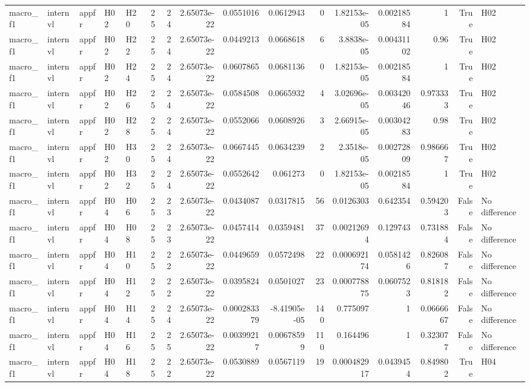 \begin{longtable}{lllllrrrrrrrrrrl}
macro\_f1 & internvl & appfr & H02 & H20 & 25 & 24 & 2.65073e-22 & 0.0551016 & 0.0612943 & 0 & 1.82153e-05 & 0.00218584 & 1 & True & H02 \\
macro\_f1 & internvl & appfr & H02 & H22 & 25 & 24 & 2.65073e-22 & 0.0449213 & 0.0668618 & 6 & 3.8838e-05 & 0.00431102 & 0.96 & True & H02 \\
macro\_f1 & internvl & appfr & H02 & H24 & 25 & 24 & 2.65073e-22 & 0.0607865 & 0.0681136 & 0 & 1.82153e-05 & 0.00218584 & 1 & True & H02 \\
macro\_f1 & internvl & appfr & H02 & H26 & 25 & 24 & 2.65073e-22 & 0.0584508 & 0.0665932 & 4 & 3.02696e-05 & 0.00342046 & 0.973333 & True & H02 \\
macro\_f1 & internvl & appfr & H02 & H28 & 25 & 24 & 2.65073e-22 & 0.0552066 & 0.0608926 & 3 & 2.66915e-05 & 0.00304283 & 0.98 & True & H02 \\
macro\_f1 & internvl & appfr & H02 & H30 & 25 & 24 & 2.65073e-22 & 0.0667445 & 0.0634239 & 2 & 2.3518e-05 & 0.00272809 & 0.986667 & True & H02 \\
macro\_f1 & internvl & appfr & H02 & H32 & 25 & 24 & 2.65073e-22 & 0.0552642 & 0.061273 & 0 & 1.82153e-05 & 0.00218584 & 1 & True & H02 \\
macro\_f1 & internvl & appfr & H04 & H06 & 25 & 23 & 2.65073e-22 & 0.0434087 & 0.0317815 & 56 & 0.0126303 & 0.642354 & 0.594203 & False & No difference \\
macro\_f1 & internvl & appfr & H04 & H08 & 25 & 23 & 2.65073e-22 & 0.0457414 & 0.0359481 & 37 & 0.00212694 & 0.129743 & 0.731884 & False & No difference \\
macro\_f1 & internvl & appfr & H04 & H10 & 25 & 22 & 2.65073e-22 & 0.0449659 & 0.0572498 & 22 & 0.000692174 & 0.0581426 & 0.826087 & False & No difference \\
macro\_f1 & internvl & appfr & H04 & H12 & 25 & 22 & 2.65073e-22 & 0.0395824 & 0.0501027 & 23 & 0.000778875 & 0.0607523 & 0.818182 & False & No difference \\
macro\_f1 & internvl & appfr & H04 & H14 & 25 & 24 & 2.65073e-22 & 0.000283379 & -8.41905e-05 & 140 & 0.775097 & 1 & 0.0666667 & False & No difference \\
macro\_f1 & internvl & appfr & H04 & H16 & 25 & 25 & 2.65073e-22 & 0.00399217 & 0.00678599 & 110 & 0.164496 & 1 & 0.323077 & False & No difference \\
macro\_f1 & internvl & appfr & H04 & H18 & 25 & 22 & 2.65073e-22 & 0.0530889 & 0.0567119 & 19 & 0.000482917 & 0.0439454 & 0.849802 & True & H04 \\

\end{longtable}
